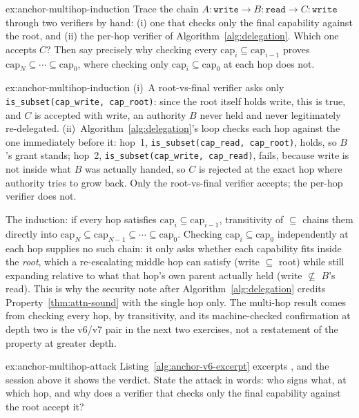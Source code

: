 \documentclass[11pt,a4paper]{article}
\theoremstyle{definition}
\begin{document}
\begin{pdexercise}[kind=Trace,rating=2]{ex:anchor-multihop-induction}
Trace the chain $A{:}\texttt{write} \to B{:}\texttt{read} \to C{:}\texttt{write}$ through two verifiers by hand: (i) one that checks only the final capability against the root, and (ii) the per-hop verifier of Algorithm~\ref{alg:delegation}. Which one accepts $C$? Then say precisely why checking every $\mathrm{cap}_i \subseteq \mathrm{cap}_{i-1}$ proves $\mathrm{cap}_N \subseteq \cdots \subseteq \mathrm{cap}_0$, where checking only $\mathrm{cap}_i \subseteq \mathrm{cap}_0$ at each hop does not.
\end{pdexercise}
\begin{pdsolution}{ex:anchor-multihop-induction}
(i)~A root-vs-final verifier asks only \texttt{is\_subset(cap\_write, cap\_root)}: since the root itself holds write, this is true, and $C$ is accepted with write, an authority $B$ never held and never legitimately re-delegated. (ii)~Algorithm~\ref{alg:delegation}'s loop checks each hop against the one immediately before it: hop~1, \texttt{is\_subset(cap\_read, cap\_root)}, holds, so $B$'s grant stands; hop~2, \texttt{is\_subset(cap\_write, cap\_read)}, fails, because write is not inside what $B$ was actually handed, so $C$ is rejected at the exact hop where authority tries to grow back. Only the root-vs-final verifier accepts; the per-hop verifier does not.

The induction: if every hop satisfies $\mathrm{cap}_i \subseteq \mathrm{cap}_{i-1}$, transitivity of $\subseteq$ chains them directly into $\mathrm{cap}_N \subseteq \mathrm{cap}_{N-1} \subseteq \cdots \subseteq \mathrm{cap}_0$. Checking $\mathrm{cap}_i \subseteq \mathrm{cap}_0$ independently at each hop supplies no such chain: it only asks whether each capability fits inside the \emph{root}, which a re-escalating middle hop can satisfy (write $\subseteq$ root) while still expanding relative to what that hop's own parent actually held (write $\not\subseteq$ $B$'s read). This is why the security note after Algorithm~\ref{alg:delegation} credits Property~\ref{thm:attn-sound} with the single hop only. The multi-hop result comes from checking every hop, by transitivity, and its machine-checked confirmation at depth two is the v6/v7 pair in the next two exercises, not a restatement of the property at greater depth.
\end{pdsolution}
\begin{pdexercise}[kind=Trace,rating=2]{ex:anchor-multihop-attack}
Listing~\ref{alg:anchor-v6-excerpt} excerpts , and the session above it shows the verdict. State the attack in words: who signs what, at which hop, and why does a verifier that checks only the final capability against the root accept it?
\end{pdexercise}
\end{document}
